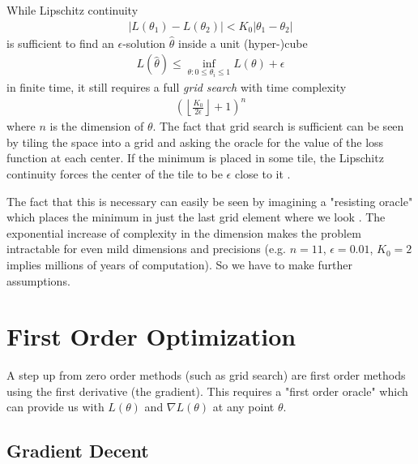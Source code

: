 While Lipschitz continuity 
%
\begin{align*}
	| L(\theta_1) - L(\theta_2) | < K_0 | \theta_1 - \theta_2 |
\end{align*}
%
is sufficient to find an \(\epsilon\)-solution \(\hat{\theta}\) inside a unit
(hyper-)cube
%
\begin{align*}
	L(\hat{\theta}) \le \inf_{\theta: 0\le\theta_i\le 1} L(\theta) + \epsilon
\end{align*}
%
in finite time, it still requires a full \emph{grid search} with time complexity
%
\begin{align*}
	\left(\left\lfloor \frac{K_0}{2\epsilon}\right\rfloor + 1\right)^n
\end{align*}
%
where \(n\) is the dimension of \(\theta\). The fact that grid search is
sufficient can be seen by tiling the space into a grid and asking the oracle
for the value of the loss function at each center. If the minimum is placed in
some tile, the Lipschitz continuity forces the center of the tile to be \(\epsilon\)
close to it \parencite[cf.][p. 11]{nesterovLecturesConvexOptimization2018}.

The fact that this is necessary can easily be seen by imagining a "resisting
oracle" which places the minimum in just the last grid element where we look
\parencite[cf.][p. 13]{nesterovLecturesConvexOptimization2018}. The exponential
increase of complexity in the dimension makes the problem intractable for even
mild dimensions and precisions (e.g. \(n=11\), \(\epsilon=0.01\), \(K_0=2\)
implies millions of years of computation). So we have to make further
assumptions. 

\section{First Order Optimization}

A step up from zero order methods (such as grid search) are first order methods
using the first derivative (the gradient). This requires a "first order oracle"
which can provide us with \(L(\theta)\) and \(\nabla L(\theta)\) at any point
\(\theta\).

\subsection{Gradient Decent}

